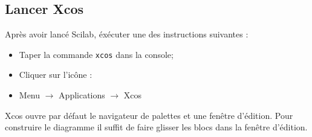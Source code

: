 \subsection{Lancer Xcos}
Après avoir lancé Scilab, éxécuter une des instructions suivantes :
\begin{itemize}
    \item Taper la commande \verb?xcos? dans la console;
    \item Cliquer sur l'icône : 
    \item Menu $\rightarrow$ Applications $\rightarrow$ Xcos
\end{itemize}
Xcos ouvre par défaut le navigateur de palettes et une fenêtre d'édition. 
Pour construire le diagramme il suffit de faire glisser les blocs dans la 
fenêtre d'édition.
